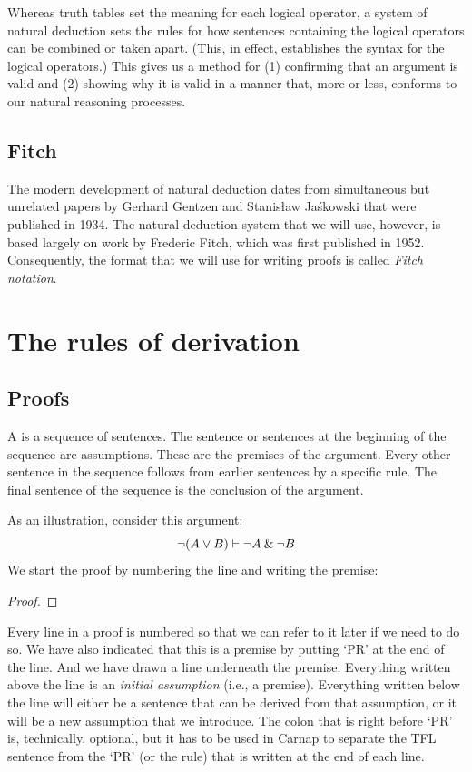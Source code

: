 Whereas truth tables set the meaning for each logical operator, a system of natural deduction sets the rules for how sentences containing the logical operators can be combined or taken apart. (This, in effect, establishes the syntax for the logical operators.) This gives us a method for (1) confirming that an argument is valid and (2) showing why it is valid in a manner that, more or less, conforms to our natural reasoning processes. 



\section{Fitch} The modern development of natural deduction dates from simultaneous but unrelated papers by Gerhard Gentzen and Stanisław Jaśkowski that were published in 1934. The natural deduction system that we will use, however, is based largely on work by Frederic Fitch, which was first published in 1952. Consequently, the format that we will use for writing proofs is called \textit{Fitch notation}.



\chapter{The rules of derivation}\label{s:BasicTFL}

\section{Proofs}

A  is a sequence of sentences. The sentence or sentences at the beginning of the sequence are assumptions. These are the premises of the argument. Every other sentence in the sequence follows from earlier sentences by a specific rule. The final sentence of the sequence is the conclusion of the argument.

As an illustration, consider this argument:
	$${\neg} (A \vee B) \vdash {\neg} A \mathbin{\&} {\neg} B$$
We start the proof by numbering the line and writing the premise:
\begin{proof}
	 \pr{}
\end{proof}
Every line in a proof is numbered so that we can refer to it later if we need to do so. We have also indicated that this is a premise by putting `PR' at the end of the line. And we have drawn a line underneath the premise. Everything written above the line is an \emph{initial assumption} (i.e., a premise). Everything written below the line will either be a sentence that can be derived from that assumption, or it will be a new assumption that we introduce. The colon that is right before `PR' is, technically, optional, but it has to be used in Carnap to separate the TFL sentence from the `PR' (or the rule) that is written at the end of each line.


